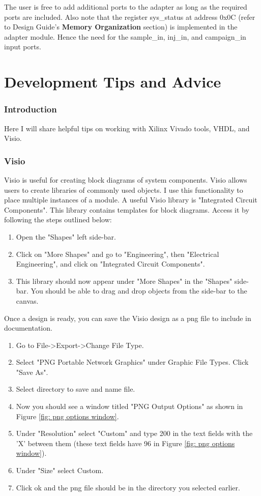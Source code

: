 \documentclass[]{report}
\begin{document}
The user is free to add additional ports to the adapter as long as the required ports are included. Also note that the register sys\_status at address 0x0C (refer to Design Guide's \textbf{Memory Organization} section) is implemented in the adapter module. Hence the need for the sample\_in, inj\_in, and campaign\_in input ports. 

\part{Development Tips and Advice}

\section*{Introduction}
Here I will share helpful tips on working with Xilinx Vivado tools, VHDL, and Visio.

\section{Visio}

Visio is useful for creating block diagrams of system components. Visio allows users to create libraries of commonly used objects. I use this functionality to place multiple instances of a module. A useful Visio library is "Integrated Circuit Components". This library contains templates for block diagrams. Access it by following the steps outlined below:
\begin{enumerate}
	\item Open the "Shapes" left side-bar.
	\item Click on "More Shapes" and go to "Engineering", then "Electrical Engineering", and click on "Integrated Circuit Components".
	\item This library should now appear under "More Shapes" in the "Shapes" side-bar. You should be able to drag and drop objects from the side-bar to the canvas. 
\end{enumerate}

Once a design is ready, you can save the Visio design as a png file to include in documentation.
\begin{enumerate}
	\item Go to File-\textgreater Export-\textgreater Change File Type.
	\item Select "PNG Portable Network Graphics" under Graphic File Types. Click "Save As".
	\item Select directory to save and name file.
	\item Now you should see a window titled "PNG Output Options" as shown in Figure \ref{fig: png options window}. 
	\item Under "Resolution" select "Custom" and type 200 in the text fields with the 'X' between them (these text fields have 96 in Figure \ref{fig: png options window}).
	\item Under "Size" select Custom.
	\item Click ok and the png file should be in the directory you selected earlier.
\end{enumerate}
\end{document}
